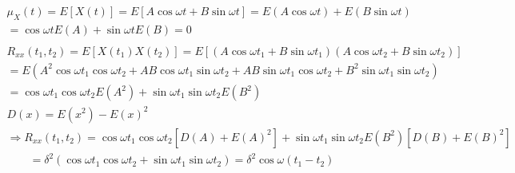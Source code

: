 \documentclass[a4paper]{article}
\begin{document}
\begin{enumerate}
\begin{gather*}
            \\
            \mu_X(t) = E\left[X(t)\right] = E\left[A\cos \omega t + B \sin \omega t\right] = E(A \cos \omega t) + E( B \sin \omega t) \\
                     = \cos \omega t E(A) + \sin \omega t E(B) = 0\\
            \\
            R_{xx}(t_1, t_2) = E\left[ X(t_1) X(t_2) \right] = E\left[(A\cos \omega t_1 + B \sin \omega t_1)(A\cos \omega t_2 + B \sin \omega t_2) \right]\\
            =E(A^2 \cos \omega t_1 \cos \omega t_2 + AB\cos \omega t_1 \sin \omega t_2 + AB \sin \omega t_1 \cos \omega t_2 + B^2 \sin \omega t_1 \sin \omega t_2) \\
            = \cos \omega t_1 \cos \omega t_2 E(A^2) + \sin \omega t_1 \sin \omega t_2 E(B^2) \\
            D(x) = E(x^2) - E(x)^2\\
            \Rightarrow R_{xx}(t_1, t_2) = \cos \omega t_1 \cos \omega t_2  \left[D(A) + E(A)^2\right] + \sin \omega t_1 \sin \omega t_2 E(B^2)\left[D(B) + E(B)^2\right]\\
            \qquad = \delta ^2 (\cos \omega t_1 \cos \omega t_2  + \sin \omega t_1 \sin \omega t_2 ) = \delta^2 \cos \omega (t_1 - t_2)
        \end{gather*}
\end{enumerate}
\end{document}
